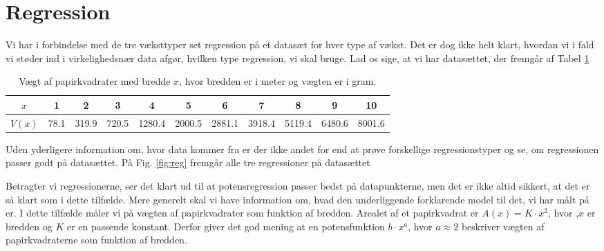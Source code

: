 \section*{Regression}
Vi har i forbindelse med de tre væksttyper set regression på et datasæt for hver type af vækst. Det er dog ikke helt klart, hvordan vi i fald vi støder ind i virkelighedsnær data afgør, hvilken type regression, vi skal bruge. Lad os sige, at vi har datasættet, der fremgår af Tabel \ref{tab:papvaegt}
\begin{table}[H]
\begin{tabular}{c|c|c|c|c|c|c|c|c|c|c}
$x$ & 1 & 2 & 3 & 4 & 5 & 6 & 7 & 8 & 9 & 10 \\ \hline
$V(x)$ & 78.1 & 319.9 & 720.5 & 1280.4 & 2000.5 & 2881.1 & 3918.4 & 5119.4 & 6480.6 & 8001.6
\end{tabular}
\caption{Vægt af papirkvadrater med bredde $x$, hvor bredden er i meter og vægten er i gram.}
\label{tab:papvaegt}
\end{table}
Uden yderligere information om, hvor data kommer fra er der ikke andet for end at prøve forskellige regressionstyper og se, om regressionen passer godt på datasættet. På Fig. \ref{fig:reg} fremgår alle tre regressioner på datasættet
\begin{figure}[H]
\end{figure}
Betragter vi regressionerne, ser det klart ud til at potensregression passer bedst på datapunkterne, men det er ikke altid sikkert, at det er så klart som i dette tilfælde. Mere generelt skal vi have information om, hvad den underliggende forklarende model til det, vi har målt på er. I dette tilfælde måler vi på vægten af papirkvadrater som funktion af bredden. Arealet af et papirkvadrat er $A(x) = K\cdot x^2$, hvor ,$x$ er bredden og $K$ er en passende konstant. Derfor giver det god mening at en potensfunktion $b\cdot x^a$, hvor $a\approx 2$ beskriver vægten af papirkvadraterne som funktion af bredden. 
